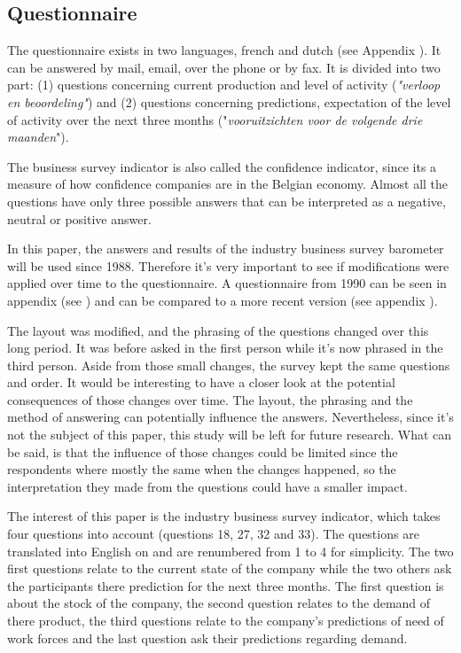 \documentclass[12pt,a4paper,oneside]{book}
\begin{document}
\subsection{Questionnaire}
\label{sec:Questionnaire}

The questionnaire exists in two languages, french and dutch (see Appendix ). It can be answered by mail, email, over the phone or by fax.
It is divided into two part:
(1) questions concerning current production and level of activity (\textit{"verloop en beoordeling"}) and
(2) questions concerning predictions, expectation of the level of activity over the next three months ("\textit{vooruitzichten voor de volgende drie maanden}").

The business survey indicator is also called the confidence indicator, since its a measure of how confidence companies are in the Belgian economy.
Almost all the questions have only three possible answers that can be interpreted as a negative, neutral or positive answer.

In this paper, the answers and results of the industry business survey barometer will be used since 1988. Therefore it's very important to see if modifications were applied over time to the questionnaire.
A questionnaire from 1990 can be seen in appendix (see ) and can be compared to a more recent version (see appendix ).

The layout was modified, and the phrasing of the questions changed over this long period. It was before asked in the first person while it's now phrased in the third person. Aside from those small changes, the survey kept the same questions and order.
It would be interesting to have a closer look at the potential consequences of those changes over time. The layout, the phrasing and the method of answering can potentially influence the answers. Nevertheless, since it's not the subject of this paper, this study will be left for future research.
What can be said, is that the influence of those changes could be limited since the respondents where mostly the same when the changes happened, so the interpretation they made from the questions could have a smaller impact.

The interest of this paper is the industry business survey indicator, which takes four questions into account (questions 18, 27, 32 and 33). The questions are translated into English on  and are renumbered from 1 to 4 for simplicity.
The two first questions relate to the current state of the company while the two others ask the participants there prediction for the next three months.
The first question is about the stock of the company, 
the second question relates to the demand of there product, 
the third questions relate to the company's predictions of need of work forces 
and the last question ask their predictions regarding demand.
\end{document}
